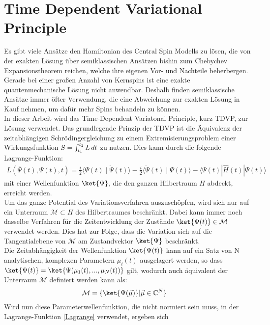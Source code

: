 \chapter{Time Dependent Variational Principle}\label{make}
Es gibt viele Ansätze den Hamiltonian des Central Spin Modells zu lösen, die von der exakten Lösung über 
semiklassischen Ansätzen\cite{PhysRevB.65.205309,PhysRevB.94.094308,PhysRevB.70.205327,NatalieJaeschke} bishin zum
Chebychev Expansionstheorem reichen\cite{PhysRevB.89.045317}, welche ihre eigenen Vor- und Nachteile beherbergen. 
Gerade bei einer großen Anzahl von Kernspins ist eine exakte quantenmechanische Lösung nicht anwendbar. Deshalb finden semiklassische Ansätze immer öfter Verwendung, 
die eine Abweichung zur exakten Lösung in Kauf nehmen, um dafür mehr Spins behandeln zu können. \\ 
In dieser Arbeit wird das Time-Dependent Variatonal Principle, kurz TDVP, zur Lösung verwendet.
Das grundlegende Prinzip der TDVP ist die Äquivalenz der zeitabhängigen Schrödingergleichung zu einem Extremisierungsproblem einer 
Wirkungsfunktion $S=\int_{t_1}^{t_2}L \thinspace dt$ zu nutzen. Dies kann durch die folgende Lagrange-Funktion:
\begin{align}\label{Lagrange}
    L\left(\overline{\Psi}(t), \Psi(t), t\right)=\frac{i}{2}\langle\Psi(t) \mid \dot{\Psi}(t)\rangle-\frac{i}{2}\langle\dot{\Psi}(t) \mid \Psi(t)\rangle-\langle\Psi(t)|\hat{H}(t)| \Psi(t)\rangle
\end{align}
mit einer Wellenfunktion $\ket{\Psi}$, die den ganzen Hilbertraum $H$ abdeckt, erreicht werden. \\
\noindent Um das ganze Potential des Variationsverfahren auszuschöpfen, wird sich nur auf ein Unterraum $\mathcal{M}\subset H$ des
Hilbertraumes beschränkt. Dabei kann immer noch dasselbe Verfahren für die Zeitentwicklung der Zustände $\ket{\Psi(t)}\in\mathcal{M}$
verwendet werden. Dies hat zur Folge, dass die Variation sich auf die Tangentialebene von $\mathcal{M}$ am Zustandvektor $\ket{\Psi}$
beschränkt.\\
Die Zeitabhängigkeit der Wellenfunktion $\ket{\Psi(t)}$ kann auf ein Satz von N analytischen, komplexen Parametern $\mu_i(t)$ ausgelagert werden, 
so dass $\ket{\Psi(t)} = \ket{\Psi(\mu_1(t),...,\mu_N(t))}$ gilt, wodurch auch äquivalent der Unterraum $\mathcal{M}$ definiert werden kann als:
\begin{align}
    \mathcal{M} &= \{\ket{\Psi(\vec{\mu})}|\vec{\mu}\in \mathbb{C}^N\}
\end{align}
Wird nun diese Parameterwellenfunktion, die nicht normiert sein muss, in der Lagrange-Funktion \autoref{Lagrange} verwendet, ergeben sich 
